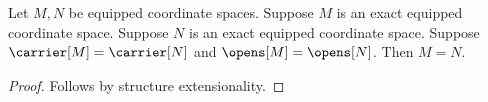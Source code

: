 

\begin{proposition}\label{forgetting_atlas_is_not_equality}
    Let $M,N$ be equipped coordinate spaces.
    Suppose $M$ is an exact equipped coordinate space.
    Suppose $N$ is an exact equipped coordinate space.
    Suppose $\carrier[M]=\carrier[N]$ and $\opens[M]=\opens[N]$.
    Then $M=N$.
\end{proposition}
\begin{proof}
    Follows by structure extensionality.
\end{proof}
